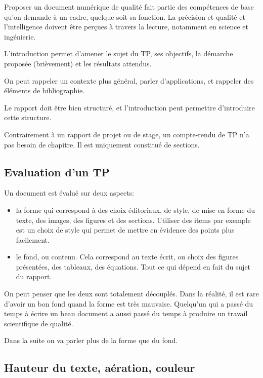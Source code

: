 Proposer un document numérique de qualité fait partie des compétences de base qu'on demande à un cadre, quelque soit sa fonction. La précision et qualité
et l'intelligence doivent être perçues à travers la lecture, notamment en
science et ingénierie. 



L'introduction permet d'amener le sujet du TP, ses objectifs, la démarche proposée (brièvement) et les résultats attendus.


On peut rappeler un contexte plus général, parler d'applications, et rappeler des éléments de bibliographie.


Le rapport doit être bien structuré, et l'introduction peut permettre d'introduire cette structure.

Contrairement à un rapport de projet ou de stage, un compte-rendu de TP n'a pas besoin de chapitre. Il est uniquement constitué de sections.

\subsection{Evaluation d'un TP}

Un document est évalué sur deux aspects:

\begin{itemize}
\item la forme qui correspond à des choix éditoriaux, de style, de mise en forme du texte, des images, des figures et des sections. Utiliser des items par exemple est un choix de style qui permet de mettre en évidence des points plus facilement.
\item le fond, ou contenu. Cela correspond au texte écrit, ou choix des figures présentées, des tableaux, des équations. Tout ce qui dépend en fait du sujet du rapport.
\end{itemize}

On peut penser que les deux sont totalement découplés. Dans la réalité, il est rare d'avoir un bon fond quand la forme est très mauvaise. Quelqu'un qui a passé 
du temps à écrire un beau document a aussi passé du temps à produire un travail
scientifique de qualité.

Dans la suite on va parler plus de la forme que du fond.

\subsection{Hauteur du texte, aération, couleur}


